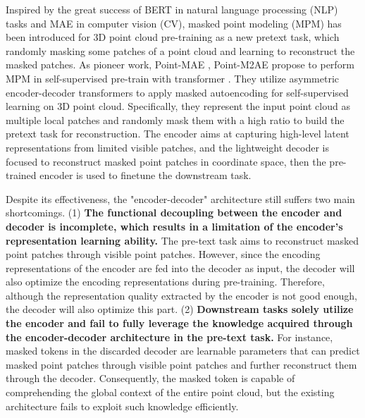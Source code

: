 \documentclass[sigconf, screen]{acmart}
\begin{document}
Inspired by the great success of BERT \cite{devlin2018bert} in natural language processing (NLP) tasks and MAE \cite{he2022masked} in computer vision (CV), masked point modeling (MPM) has been introduced for 3D point cloud pre-training as a new pretext task, which randomly masking some patches of a point cloud and learning to reconstruct the masked patches. 
As pioneer work, Point-MAE \cite{pang2022masked}, Point-M2AE \cite{zhang2022point} propose to perform MPM in self-supervised pre-train with transformer \cite{vaswani2017attention}. 
They utilize asymmetric encoder-decoder transformers to apply masked autoencoding for self-supervised learning on 3D point cloud. 
Specifically, they represent the input point cloud as multiple local patches and randomly mask them with a high ratio to build the pretext task for reconstruction.
The encoder aims at capturing high-level latent representations from limited visible patches, and the lightweight decoder is focused to reconstruct masked point patches in coordinate space, then the pre-trained encoder is used to finetune the downstream task. 




Despite its effectiveness, the "encoder-decoder" architecture still suffers two main shortcomings. (1) \textbf{The functional decoupling between the encoder and decoder is incomplete, which results in a limitation of the encoder's representation learning ability.} The pre-text task aims to reconstruct masked point patches through visible point patches. However, since the encoding representations of the encoder are fed into the decoder as input, the decoder will also optimize the encoding representations during pre-training. Therefore, although the representation quality extracted by the encoder is not good enough, the decoder will also optimize this part.
(2) \textbf{Downstream tasks solely utilize the encoder and fail to fully leverage the knowledge acquired through the encoder-decoder architecture in the pre-text task.} For instance, masked tokens in the discarded decoder are learnable parameters that can predict masked point patches through visible point patches and further reconstruct them through the decoder. Consequently, the masked token is capable of comprehending the global context of the entire point cloud, but the existing architecture fails to exploit such knowledge efficiently.
\end{document}
